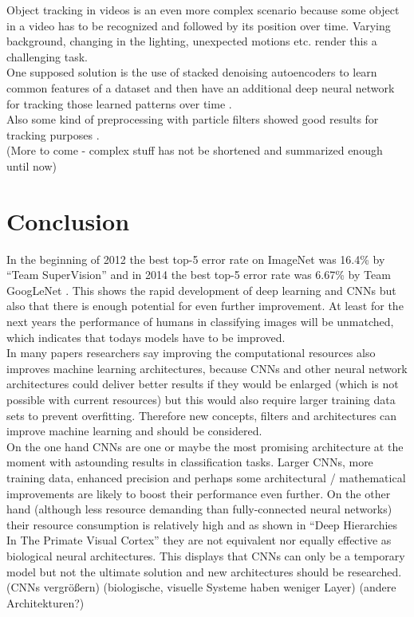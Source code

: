 \documentclass[12pt,twoside]{article}
\theoremstyle{plain}
\theoremstyle{definition}
\theoremstyle{remark}
\begin{document}
Object tracking in videos is an even more complex scenario because some object in a video has to be recognized and followed by its position over time. Varying background, changing in the lighting, unexpected motions etc. render this a challenging task.
\\
One supposed solution is the use of stacked denoising autoencoders to learn common features of a dataset and then have an additional deep neural network for tracking those learned patterns over time \cite{LearningDeepCompactImageTracking-Wang}.
\\
Also some kind of preprocessing with particle filters showed good results for tracking purposes \cite{LearningDeepCompactImageTracking-Wang}.
\\
(More to come - complex stuff has not be shortened and summarized enough until now)



\section{Conclusion}
\label{sec:concl}

In the beginning of 2012 the best top-5 error rate on ImageNet was 16.4\% by \enquote{Team SuperVision} and in 2014 the best top-5 error rate was 6.67\% by Team GoogLeNet \cite{GoogLeNet}. This shows the rapid development of deep learning and CNNs but also that there is enough potential for even further improvement. At least for the next years the performance of humans in classifying images will be unmatched, which indicates that todays models have to be improved.
\\
In many papers \cite{GoogLeNet, DeepNeuralNetworksObjectDetection-Szegedy, ImangeNetClassificationCNN-Krizhevsky, LearningDeepCompactImageTracking-Wang, MultiColumnDeepNeuralNetworksClassification-Ciresan} researchers say improving the computational resources also improves machine learning architectures, because CNNs and other neural network architectures could deliver better results if they would be enlarged (which is not possible with current resources) but this would also require larger training data sets to prevent overfitting. Therefore new concepts, filters and architectures can improve machine learning and should be considered.
\\
On the one hand CNNs are one or maybe the most promising architecture at the moment \cite{GoogLeNet, ImangeNetClassificationCNN-Krizhevsky} with astounding results in classification tasks. Larger CNNs, more training data, enhanced precision and perhaps some architectural / mathematical improvements are likely to boost their performance even further.
On the other hand (although less resource demanding than fully-connected neural networks) their resource consumption is relatively high and as shown in \enquote{Deep Hierarchies In The Primate Visual Cortex} \cite{DeepHierarchiesVisualCortex-kruger} they are not equivalent nor equally effective as biological neural architectures. This displays that CNNs can only be a temporary model but not the ultimate solution and new architectures should be researched.
(CNNs vergrößern)
(biologische, visuelle Systeme haben weniger Layer)
(andere Architekturen?)
\end{document}
